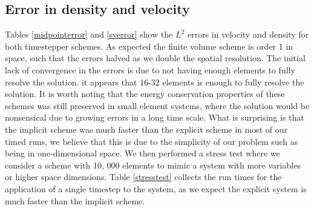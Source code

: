 \documentclass[a4paper,11pt]{article}
\begin{document}
\subsection{ Error in density and velocity}

Tables \ref{midpointerror} and \ref{sverror} show the $L^2$ errors in velocity and density for both timestepper schemes. As expected the finite volume scheme is order 1 in space, such that the errors halved as we double the spatial resolution. The initial lack of convergence in the errors is due to not having enough elements to fully resolve the solution. it appears that 16-32 elements is enough to fully resolve the solution. It is worth noting that the energy conservation properties of these schemes was still preserved in small element systems, where the solution would be nonsensical due to growing errors in a long time scale.
What is surprising is that the implicit scheme was much faster than the explicit scheme in most of our timed runs, we believe that this is due to the simplicity of our problem such as being in one-dimensional space.  We then performed a stress test where we consider a scheme with 10, 000 elements to mimic a system with more variables or higher space dimensions. Table \ref{stresstest} collects the run times for the application of a single timestep to the system, as we expect the explicit system is much faster than the implicit scheme. 
\end{document}
